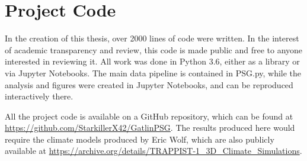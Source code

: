 \chapter{Project Code}
In the creation of this thesis, over 2000 lines of code were written. In the
 interest of academic transparency and review, this code is made public and free
 to anyone interested in reviewing it. All work was done in Python 3.6, either
 as a library or via Jupyter Notebooks. The main data pipeline is contained in
 PSG.py, while the analysis and figures were created in Jupyter Notebooks, and
 can be reproduced interactively there.

All the project code is available on a GitHub repository, which can be found at
 \url{https://github.com/StarkillerX42/GatlinPSG}. The results produced here
 would require the climate models produced by Eric Wolf, which are also publicly
 available at
 \url{https://archive.org/details/TRAPPIST-1_3D_Climate_Simulations}.